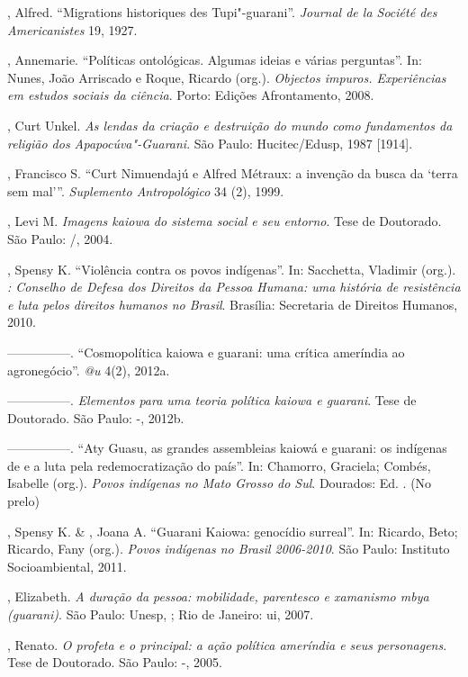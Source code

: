 \begin{Parskip}
, Alfred. ``Migrations historiques des Tupi"-guarani''. \emph{Journal
de la Société des Americanistes} 19, 1927.

, Annemarie. ``Políticas ontológicas. Algumas ideias e várias
perguntas''. In: Nunes, João Arriscado e Roque, Ricardo (org.). \emph{Objectos
impuros. Experiências em estudos sociais da ciência}. Porto: Edições
Afrontamento, 2008.

, Curt Unkel. \emph{As lendas da criação e destruição do mundo
como fundamentos da religião dos Apapocúva"-Guarani}. São Paulo:
Hucitec/Edusp, 1987 [1914].

, Francisco S. ``Curt Nimuendajú e Alfred Métraux: a invenção
da busca da `terra sem mal'''. \emph{Suplemento Antropológico} 34 (2), 1999. 

, Levi M. \emph{Imagens kaiowa do sistema social e seu entorno}.
Tese de Doutorado. São Paulo: /, 2004.

, Spensy K. ``Violência contra os povos indígenas''. In:
Sacchetta, Vladimir (org.). \emph{: Conselho de Defesa dos Direitos da
Pessoa Humana: uma história de resistência e luta pelos direitos
humanos no Brasil}. Brasília: Secretaria de Direitos Humanos, 2010.

—————. ``Cosmopolítica kaiowa e guarani: uma crítica ameríndia ao
agronegócio''. \emph{@u} 4(2), 2012a.

—————. \emph{Elementos para uma teoria política kaiowa e guarani}. Tese
de Doutorado. São Paulo: -, 2012b. 

—————. ``Aty Guasu, as grandes assembleias kaiowá e guarani: os
indígenas de  e a luta pela redemocratização do país''. In: Chamorro,
Graciela; Combés, Isabelle (org.). \emph{Povos indígenas no Mato Grosso do
Sul}. Dourados: Ed. . (No prelo)

, Spensy K. \& , Joana A. ``Guarani Kaiowa: genocídio
surreal''. In: Ricardo, Beto; Ricardo, Fany (org.). \emph{Povos indígenas no
Brasil 2006-2010}. São Paulo: Instituto Socioambiental, 2011.

, Elizabeth. \emph{A duração da pessoa: mobilidade, parentesco
e xamanismo mbya (guarani)}. São Paulo: Unesp, ; Rio de Janeiro:
ui, 2007.

, Renato. \emph{O profeta e o principal: a ação política
ameríndia e seus personagens}. Tese de Doutorado. São Paulo: -,
2005.


\end{Parskip}
